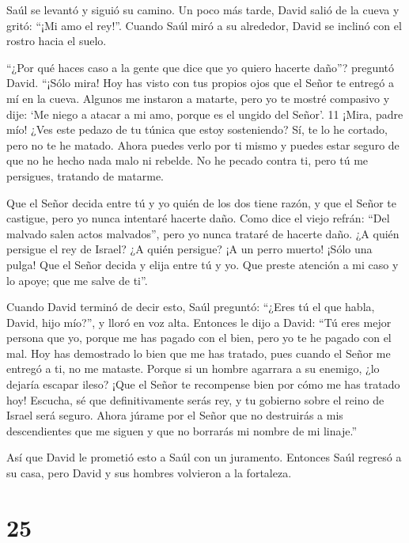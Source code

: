 Saúl se levantó y siguió su camino.  Un poco más tarde,
David salió de la cueva y gritó: ``¡Mi amo el rey!''. Cuando Saúl miró a
su alrededor, David se inclinó con el rostro hacia el suelo.

 ``¿Por qué haces caso a la gente que dice que yo quiero
hacerte daño''? preguntó David.  ``¡Sólo mira! Hoy has
visto con tus propios ojos que el Señor te entregó a mí en la cueva.
Algunos me instaron a matarte, pero yo te mostré compasivo y dije: `Me
niego a atacar a mi amo, porque es el ungido del Señor'. 11 ¡Mira, padre
mío! ¿Ves este pedazo de tu túnica que estoy sosteniendo? Sí, te lo he
cortado, pero no te he matado. Ahora puedes verlo por ti mismo y puedes
estar seguro de que no he hecho nada malo ni rebelde. No he pecado
contra ti, pero tú me persigues, tratando de matarme.

 Que el Señor decida entre tú y yo quién de los dos tiene
razón, y que el Señor te castigue, pero yo nunca intentaré hacerte daño.
 Como dice el viejo refrán: ``Del malvado salen actos
malvados'', pero yo nunca trataré de hacerte daño.  ¿A
quién persigue el rey de Israel? ¿A quién persigue? ¡A un perro muerto!
¡Sólo una pulga!  Que el Señor decida y elija entre tú y
yo. Que preste atención a mi caso y lo apoye; que me salve de ti''.

 Cuando David terminó de decir esto, Saúl preguntó: ``¿Eres
tú el que habla, David, hijo mío?'', y lloró en voz alta. 
Entonces le dijo a David: ``Tú eres mejor persona que yo, porque me has
pagado con el bien, pero yo te he pagado con el mal.  Hoy
has demostrado lo bien que me has tratado, pues cuando el Señor me
entregó a ti, no me mataste.  Porque si un hombre agarrara
a su enemigo, ¿lo dejaría escapar ileso? ¡Que el Señor te recompense
bien por cómo me has tratado hoy!  Escucha, sé que
definitivamente serás rey, y tu gobierno sobre el reino de Israel será
seguro.  Ahora júrame por el Señor que no destruirás a mis
descendientes que me siguen y que no borrarás mi nombre de mi linaje.''

 Así que David le prometió esto a Saúl con un juramento.
Entonces Saúl regresó a su casa, pero David y sus hombres volvieron a la
fortaleza.

\hypertarget{section-24}{%
\section{25}\label{section-24}}

